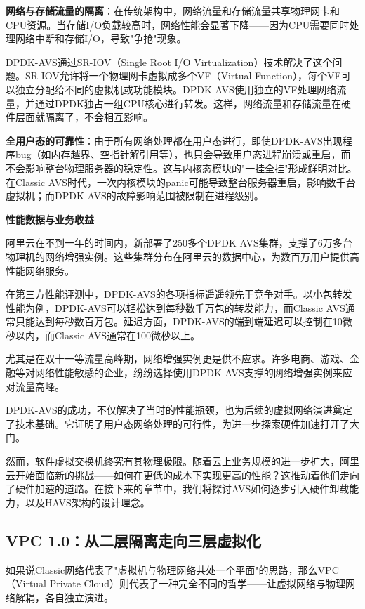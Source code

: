 \textbf{网络与存储流量的隔离}：在传统架构中，网络流量和存储流量共享物理网卡和CPU资源。当存储I/O负载较高时，网络性能会显著下降——因为CPU需要同时处理网络中断和存储I/O，导致"争抢"现象。

DPDK-AVS通过SR-IOV（Single Root I/O Virtualization）技术解决了这个问题。SR-IOV允许将一个物理网卡虚拟成多个VF（Virtual Function），每个VF可以独立分配给不同的虚拟机或功能模块。DPDK-AVS使用独立的VF处理网络流量，并通过DPDK独占一组CPU核心进行转发。这样，网络流量和存储流量在硬件层面就隔离了，不会相互影响。

\textbf{全用户态的可靠性}：由于所有网络处理都在用户态进行，即使DPDK-AVS出现程序bug（如内存越界、空指针解引用等），也只会导致用户态进程崩溃或重启，而不会影响整台物理服务器的稳定性。这与内核态模块的"一挂全挂"形成鲜明对比。在Classic AVS时代，一次内核模块的panic可能导致整台服务器重启，影响数千台虚拟机；而DPDK-AVS的故障影响范围被限制在进程级别。

\textbf{性能数据与业务收益}

阿里云在不到一年的时间内，新部署了250多个DPDK-AVS集群，支撑了6万多台物理机的网络增强实例。这些集群分布在阿里云的数据中心，为数百万用户提供高性能网络服务。

在第三方性能评测中，DPDK-AVS的各项指标遥遥领先于竞争对手。以小包转发性能为例，DPDK-AVS可以轻松达到每秒数千万包的转发能力，而Classic AVS通常只能达到每秒数百万包。延迟方面，DPDK-AVS的端到端延迟可以控制在10微秒以内，而Classic AVS通常在100微秒以上。

尤其是在双十一等流量高峰期，网络增强实例更是供不应求。许多电商、游戏、金融等对网络性能敏感的企业，纷纷选择使用DPDK-AVS支撑的网络增强实例来应对流量高峰。

DPDK-AVS的成功，不仅解决了当时的性能瓶颈，也为后续的虚拟网络演进奠定了技术基础。它证明了用户态网络处理的可行性，为进一步探索硬件加速打开了大门。

然而，软件虚拟交换机终究有其物理极限。随着云上业务规模的进一步扩大，阿里云开始面临新的挑战——如何在更低的成本下实现更高的性能？这推动着他们走向了硬件加速的道路。在接下来的章节中，我们将探讨AVS如何逐步引入硬件卸载能力，以及HAVS架构的设计理念。

\subsection{VPC 1.0：从二层隔离走向三层虚拟化}

如果说Classic网络代表了"虚拟机与物理网络共处一个平面"的思路，那么VPC（Virtual Private Cloud）则代表了一种完全不同的哲学——让虚拟网络与物理网络解耦，各自独立演进。

